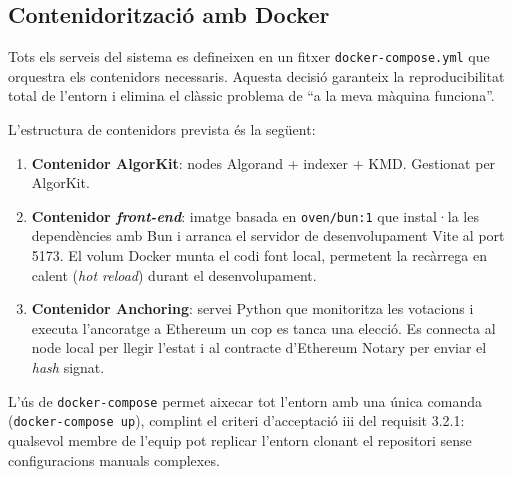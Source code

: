 \subsection{Contenidorització amb Docker}
 
Tots els serveis del sistema es defineixen en un fitxer \texttt{docker-compose.yml} que orquestra els contenidors necessaris. Aquesta decisió garanteix la reproducibilitat total de l'entorn i elimina el clàssic problema de ``a la meva màquina funciona''.
 
L'estructura de contenidors prevista és la següent:
 
\begin{enumerate}[label=\roman*.]
    \item \textbf{Contenidor AlgorKit}: nodes Algorand + indexer + KMD. Gestionat per AlgorKit.
    \item \textbf{Contenidor \textit{front-end}}: imatge basada en \texttt{oven/bun:1} que instal·la les dependències amb Bun i arranca el servidor de desenvolupament Vite al port 5173. El volum Docker munta el codi font local, permetent la recàrrega en calent (\textit{hot reload}) durant el desenvolupament.
    \item \textbf{Contenidor Anchoring}: servei Python que monitoritza les votacions i executa l'ancoratge a Ethereum un cop es tanca una elecció. Es connecta al node local per llegir l'estat i al contracte d'Ethereum Notary per enviar el \textit{hash} signat.
\end{enumerate}

 
L'ús de \texttt{docker-compose} permet aixecar tot l'entorn amb una única comanda (\texttt{docker-compose up}), complint el criteri d'acceptació iii del requisit 3.2.1: qualsevol membre de l'equip pot replicar l'entorn clonant el repositori sense configuracions manuals complexes.
 
 
 
 
